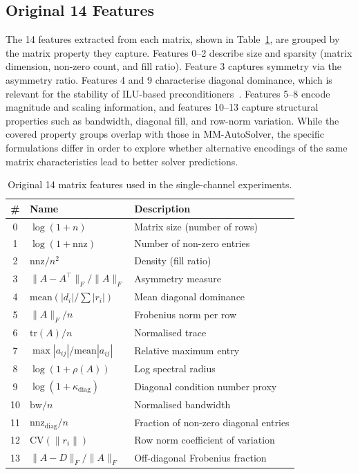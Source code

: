 \subsection{Original 14 Features}\label{subsec:features-14}

The 14 features extracted from each matrix, shown in Table~\ref{tab:features-14}, are grouped by the matrix property they capture.
Features 0--2 describe size and sparsity (matrix dimension, non-zero count, and fill ratio).
Feature 3 captures symmetry via the asymmetry ratio.
Features 4 and 9 characterise diagonal dominance, which is relevant for the stability of ILU-based preconditioners~\cite{meijerink1977iterative, saad2003iterative}.
Features 5--8 encode magnitude and scaling information,
and features 10--13 capture structural properties such as bandwidth, diagonal fill, and row-norm variation.
While the covered property groups overlap with those in MM-AutoSolver,
the specific formulations differ in order to explore whether alternative encodings of the same matrix characteristics lead to better solver predictions.

\begin{table}[h]
  \centering
  \caption{Original 14 matrix features used in the single-channel experiments.}
  \label{tab:features-14}
  \begin{tabular}{cll}
    \toprule
    \textbf{\#} & \textbf{Name} & \textbf{Description} \\
    \midrule
    0  & $\log(1+n)$                     & Matrix size (number of rows) \\
    1  & $\log(1+\text{nnz})$            & Number of non-zero entries \\
    2  & $\text{nnz}/n^2$                & Density (fill ratio) \\
    3  & $\|A - A^\top\|_F / \|A\|_F$   & Asymmetry measure \\
    4  & $\text{mean}(|d_i| / \sum|r_i|)$ & Mean diagonal dominance \\
    5  & $\|A\|_F / n$                   & Frobenius norm per row \\
    6  & $\text{tr}(A) / n$              & Normalised trace \\
    7  & $\max|a_{ij}| / \text{mean}|a_{ij}|$ & Relative maximum entry \\
    8  & $\log(1 + \rho(A))$             & Log spectral radius \\
    9  & $\log(1 + \kappa_\text{diag})$  & Diagonal condition number proxy \\
    10 & $\text{bw} / n$                 & Normalised bandwidth \\
    11 & $\text{nnz}_\text{diag} / n$    & Fraction of non-zero diagonal entries \\
    12 & $\text{CV}(\|r_i\|)$            & Row norm coefficient of variation \\
    13 & $\|A - D\|_F / \|A\|_F$        & Off-diagonal Frobenius fraction \\
    \bottomrule
  \end{tabular}
\end{table}

